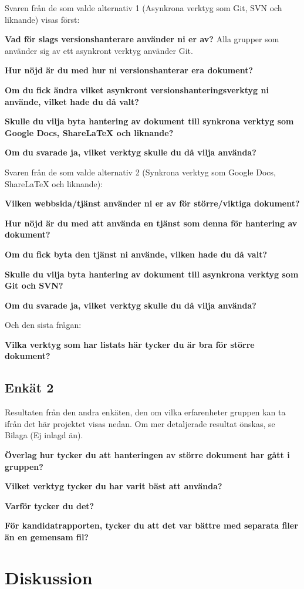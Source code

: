 Svaren från de som valde alternativ 1 (Asynkrona verktyg som Git, SVN och liknande) visas först:

\textbf{Vad för slags versionshanterare använder ni er av?}
Alla grupper som använder sig av ett asynkront verktyg använder Git.

\textbf{Hur nöjd är du med hur ni versionshanterar era dokument?}

\textbf{Om du fick ändra vilket asynkront versionshanteringsverktyg ni använde, vilket hade du då valt?}

\textbf{Skulle du vilja byta hantering av dokument till synkrona verktyg som Google Docs, ShareLaTeX och liknande?}

\textbf{Om du svarade ja, vilket verktyg skulle du då vilja använda?}

Svaren från de som valde alternativ 2 (Synkrona verktyg som Google Docs, ShareLaTeX och liknande):

\textbf{Vilken webbsida/tjänst använder ni er av för större/viktiga dokument?}

\textbf{Hur nöjd är du med att använda en tjänst som denna för hantering av dokument?}

\textbf{Om du fick byta den tjänst ni använde, vilken hade du då valt?}

\textbf{Skulle du vilja byta hantering av dokument till asynkrona verktyg som Git och SVN?}

\textbf{Om du svarade ja, vilket verktyg skulle du då vilja använda?}

Och den sista frågan:

\textbf{Vilka verktyg som har listats här tycker du är bra för större dokument?}

\subsection{Enkät 2}
Resultaten från den andra enkäten, den om vilka erfarenheter gruppen kan ta ifrån det här projektet visas nedan. Om mer detaljerade resultat önskas, se Bilaga (Ej inlagd än).

\textbf{Överlag hur tycker du att hanteringen av större dokument har gått i gruppen?}

\textbf{Vilket verktyg tycker du har varit bäst att använda?}

\textbf{Varför tycker du det?}

\textbf{För kandidatrapporten, tycker du att det var bättre med separata filer än en gemensam fil?}

\section{Diskussion}
\label{sec:discussion-tuhkala}

